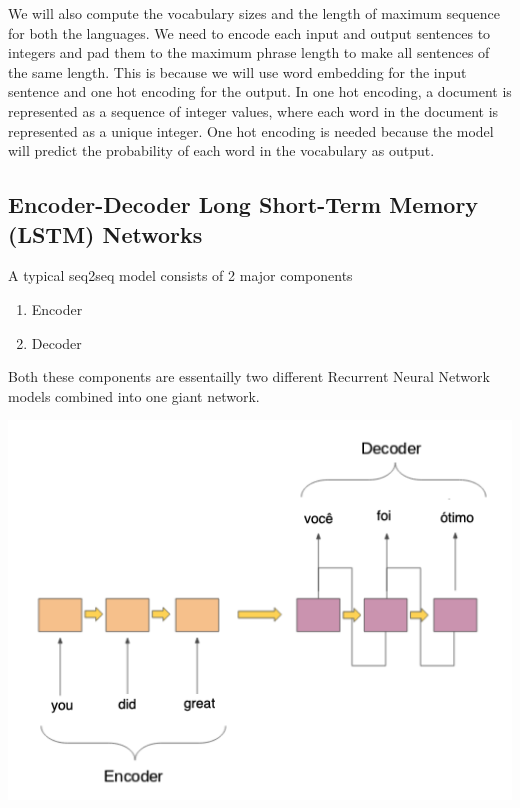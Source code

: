 \documentclass{llncs}
\begin{document}
	We will also compute the vocabulary sizes and the length of maximum sequence for both the languages. We need to encode each input and output sentences to integers and  pad them to the maximum phrase length to make all sentences of the same length. This is because we will use word embedding for the input sentence and one hot encoding for the output. In one hot encoding, a document is represented as a sequence of integer values, where each word in the document is represented as a unique integer. One hot encoding is needed because the model will predict the probability of each word in the vocabulary as output.
	

	
	\subsection{Encoder-Decoder Long Short-Term Memory (LSTM) Networks}	
	A typical seq2seq model consists of 2 major components
	\begin{enumerate}
		\item Encoder
		\item Decoder
	\end{enumerate}
	
	Both these components are essentailly two different Recurrent Neural Network models combined into one giant network.
	
	\begin{minipage}{\linewidth}
		\begin{center}
			\includegraphics[width=\linewidth]{enc_dec_2.png}
			\label{fig:Sequence to Sequence Model}
		\end{center}
	\end{minipage}
	\afterpage{\clearpage}
	
\end{document}

